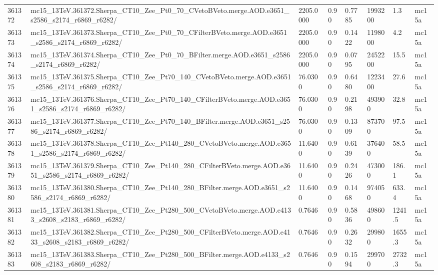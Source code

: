 \begin{sidewaystable}[!htp]
\begin{center}
{\begin{tabular}{llllllll}
361372  &  mc15\_13TeV.361372.Sherpa\_CT10\_Zee\_Pt0\_70\_CVetoBVeto.merge.AOD.e3651\_s2586\_s2174\_r6869\_r6282/  &  2205.0000  &  0.90  &  0.7785  &  1993200  &  1.3  &  mc15a \\
361373  &  mc15\_13TeV.361373.Sherpa\_CT10\_Zee\_Pt0\_70\_CFilterBVeto.merge.AOD.e3651\_s2586\_s2174\_r6869\_r6282/  &  2205.0000  &  0.90  &  0.1422  &  1198000  &  4.2  &  mc15a \\
361374  &  mc15\_13TeV.361374.Sherpa\_CT10\_Zee\_Pt0\_70\_BFilter.merge.AOD.e3651\_s2586\_s2174\_r6869\_r6282/  &  2205.0000  &  0.90  &  0.0795  &  2452200  &  15.5  &  mc15a \\
361375  &  mc15\_13TeV.361375.Sherpa\_CT10\_Zee\_Pt70\_140\_CVetoBVeto.merge.AOD.e3651\_s2586\_s2174\_r6869\_r6282/  &  76.0300  &  0.90  &  0.6480  &  1223400  &  27.6  &  mc15a \\
361376  &  mc15\_13TeV.361376.Sherpa\_CT10\_Zee\_Pt70\_140\_CFilterBVeto.merge.AOD.e3651\_s2586\_s2174\_r6869\_r6282/  &  76.0300  &  0.90  &  0.2198  &  493900  &  32.8  &  mc15a \\
361377  &  mc15\_13TeV.361377.Sherpa\_CT10\_Zee\_Pt70\_140\_BFilter.merge.AOD.e3651\_s2586\_s2174\_r6869\_r6282/  &  76.0300  &  0.90  &  0.1309  &  873700  &  97.5  &  mc15a \\
361378  &  mc15\_13TeV.361378.Sherpa\_CT10\_Zee\_Pt140\_280\_CVetoBVeto.merge.AOD.e3651\_s2586\_s2174\_r6869\_r6282/  &  11.6400  &  0.90  &  0.6139  &  376400  &  58.5  &  mc15a \\
361379  &  mc15\_13TeV.361379.Sherpa\_CT10\_Zee\_Pt140\_280\_CFilterBVeto.merge.AOD.e3651\_s2586\_s2174\_r6869\_r6282/  &  11.6400  &  0.90  &  0.2426  &  473000  &  186.1  &  mc15a \\
361380  &  mc15\_13TeV.361380.Sherpa\_CT10\_Zee\_Pt140\_280\_BFilter.merge.AOD.e3651\_s2586\_s2174\_r6869\_r6282/  &  11.6400  &  0.90  &  0.1468  &  974050  &  633.4  &  mc15a \\
361381  &  mc15\_13TeV.361381.Sherpa\_CT10\_Zee\_Pt280\_500\_CVetoBVeto.merge.AOD.e4133\_s2608\_s2183\_r6869\_r6282/  &  0.7646  &  0.90  &  0.5836  &  498600  &  1241.5  &  mc15a \\
361382  &  mc15\_13TeV.361382.Sherpa\_CT10\_Zee\_Pt280\_500\_CFilterBVeto.merge.AOD.e4133\_s2608\_s2183\_r6869\_r6282/  &  0.7646  &  0.90  &  0.2632  &  299800  &  1655.3  &  mc15a \\
361383  &  mc15\_13TeV.361383.Sherpa\_CT10\_Zee\_Pt280\_500\_BFilter.merge.AOD.e4133\_s2608\_s2183\_r6869\_r6282/  &  0.7646  &  0.90  &  0.1594  &  299700  &  2732.3  &  mc15a \\

\end{tabular}}
\end{center}
\end{sidewaystable}
